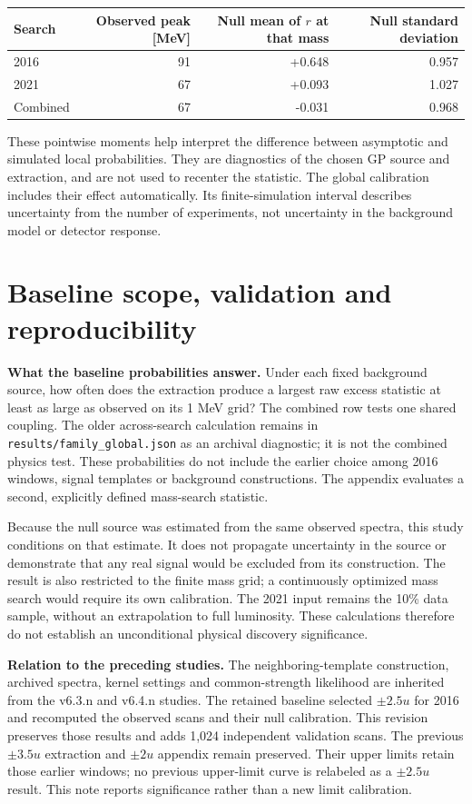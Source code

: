 \documentclass[11pt]{article}
\begin{document}
\begin{center}\small\begin{tabular}{lrrr}\toprule
Search & Observed peak [MeV] & Null mean of $r$ at that mass & Null standard deviation\\\midrule
2016 & 91 & +0.648 & 0.957\\
2021 & 67 & +0.093 & 1.027\\
Combined & 67 & -0.031 & 0.968\\
\bottomrule\end{tabular}\end{center}

These pointwise moments help interpret the difference between asymptotic and simulated local probabilities. They are diagnostics of the chosen GP source and extraction, and are not used to recenter the statistic. The global calibration includes their effect automatically. Its finite-simulation interval describes uncertainty from the number of experiments, not uncertainty in the background model or detector response.

\clearpage\section*{Baseline scope, validation and reproducibility}

\textbf{What the baseline probabilities answer.} Under each fixed background source, how often does the extraction produce a largest raw excess statistic at least as large as observed on its 1 MeV grid? The combined row tests one shared coupling. The older across-search calculation remains in \texttt{results/family\_global.json} as an archival diagnostic; it is not the combined physics test. These probabilities do not include the earlier choice among 2016 windows, signal templates or background constructions. The appendix evaluates a second, explicitly defined mass-search statistic.

Because the null source was estimated from the same observed spectra, this study conditions on that estimate. It does not propagate uncertainty in the source or demonstrate that any real signal would be excluded from its construction. The result is also restricted to the finite mass grid; a continuously optimized mass search would require its own calibration. The 2021 input remains the 10\% data sample, without an extrapolation to full luminosity. These calculations therefore do not establish an unconditional physical discovery significance.

\textbf{Relation to the preceding studies.} The neighboring-template construction, archived spectra, kernel settings and common-strength likelihood are inherited from the v6.3.n and v6.4.n studies. The retained baseline selected $\pm2.5u$ for 2016 and recomputed the observed scans and their null calibration. This revision preserves those results and adds 1,024 independent validation scans. The previous $\pm3.5u$ extraction and $\pm2u$ appendix remain preserved. Their upper limits retain those earlier windows; no previous upper-limit curve is relabeled as a $\pm2.5u$ result. This note reports significance rather than a new limit calibration.
\end{document}
